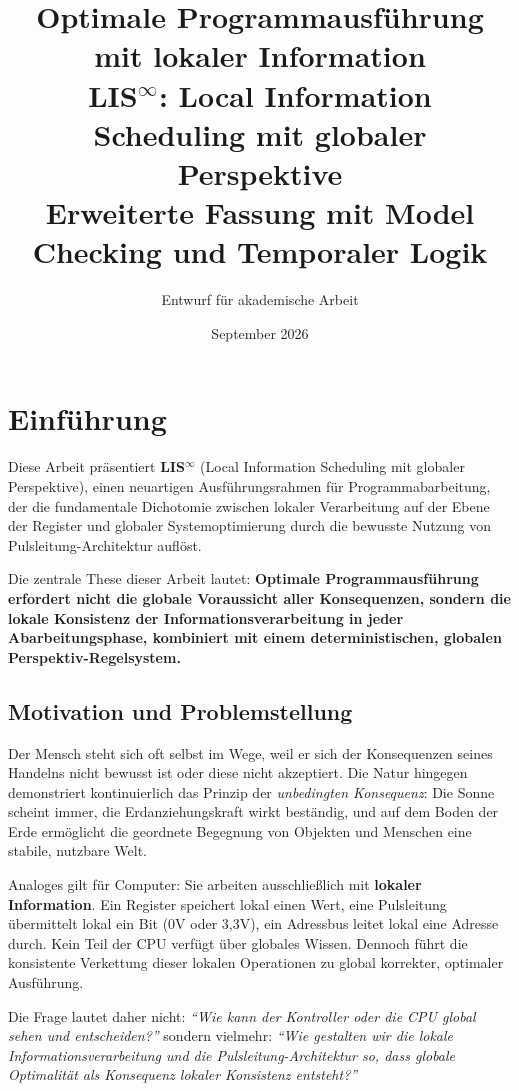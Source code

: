 \documentclass[a4paper,12pt]{article}
\title{\textbf{Optimale Programmausführung mit lokaler Information}\\
	LIS$^{\infty}$: Local Information Scheduling mit globaler Perspektive\\
	\large{Erweiterte Fassung mit Model Checking und Temporaler Logik}}
\author{Entwurf für akademische Arbeit}
\date{September 2026}
\theoremstyle{definition}
\begin{document}
	
	\maketitle
	
	\tableofcontents
	\newpage
	
	\section{Einführung}
	\label{sec:einfuehrung}
	
	Diese Arbeit präsentiert \textbf{LIS$^{\infty}$} (Local Information Scheduling mit globaler Perspektive), einen neuartigen Ausführungsrahmen für Programmabarbeitung, der die fundamentale Dichotomie zwischen lokaler Verarbeitung auf der Ebene der Register und globaler Systemoptimierung durch die bewusste Nutzung von Pulsleitung-Architektur auflöst. 
	
	Die zentrale These dieser Arbeit lautet: \textbf{Optimale Programmausführung erfordert nicht die globale Voraussicht aller Konsequenzen, sondern die lokale Konsistenz der Informationsverarbeitung in jeder Abarbeitungsphase, kombiniert mit einem deterministischen, globalen Perspektiv-Regelsystem.}
	
	\subsection{Motivation und Problemstellung}
	
	Der Mensch steht sich oft selbst im Wege, weil er sich der Konsequenzen seines Handelns nicht bewusst ist oder diese nicht akzeptiert. Die Natur hingegen demonstriert kontinuierlich das Prinzip der \emph{unbedingten Konsequenz}: Die Sonne scheint immer, die Erdanziehungskraft wirkt beständig, und auf dem Boden der Erde ermöglicht die geordnete Begegnung von Objekten und Menschen eine stabile, nutzbare Welt.
	
	Analoges gilt für Computer: Sie arbeiten ausschließlich mit \textbf{lokaler Information}. Ein Register speichert lokal einen Wert, eine Pulsleitung übermittelt lokal ein Bit (0V oder 3,3V), ein Adressbus leitet lokal eine Adresse durch. Kein Teil der CPU verfügt über globales Wissen. Dennoch führt die konsistente Verkettung dieser lokalen Operationen zu global korrekter, optimaler Ausführung.
	
	Die Frage lautet daher nicht: \textit{``Wie kann der Kontroller oder die CPU global sehen und entscheiden?''} sondern vielmehr: \textit{``Wie gestalten wir die lokale Informationsverarbeitung und die Pulsleitung-Architektur so, dass globale Optimalität als Konsequenz lokaler Konsistenz entsteht?''}
	
\end{document}
